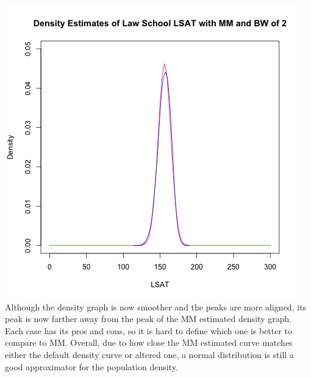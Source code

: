 \documentclass[12pt, letterpaper]{article}
\begin{document}
\includegraphics[scale=0.85]{Lawschool_LSAT_Density_mmbw} \\
Although the density graph is now smoother and the peaks are more aligned, its peak is now farther away from the peak of the MM estimated density graph. Each case has its pros and cons, so it is hard to define which one is better to compare to MM. Overall, due to how close the MM estimated curve matches either the default density curve or altered one, a normal distribution is still a good approximator for the population density. 
\end{document}
